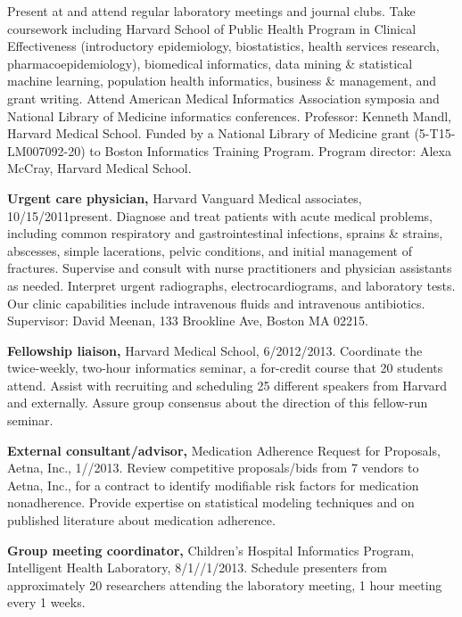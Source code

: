\documentclass[12pt]{article}
\begin{document}
Present at and attend regular laboratory meetings and journal clubs.
Take coursework including Harvard School of Public Health Program in
Clinical Effectiveness (introductory epidemiology, biostatistics,
health services research, pharmacoepidemiology), biomedical
informatics, data mining \& statistical machine learning, population
health informatics, business \& management, and grant writing. Attend
American Medical Informatics Association symposia and National Library
of Medicine informatics conferences. Professor: Kenneth Mandl, Harvard
Medical School. Funded by a National Library of Medicine grant
(5-T15-LM007092-20) to Boston Informatics Training Program. Program
director: Alexa McCray, Harvard Medical School.

\textbf{Urgent care physician,} Harvard Vanguard Medical associates,
10/15/2011\ndash{}present. Diagnose and treat patients with acute
medical problems, including common respiratory and gastrointestinal
infections, sprains \& strains, abscesses, simple lacerations, pelvic
conditions, and initial management of fractures. Supervise and consult
with nurse practitioners and physician assistants as needed. Interpret
urgent radiographs, electrocardiograms, and laboratory tests. Our
clinic capabilities include intravenous fluids and intravenous
antibiotics. Supervisor: David Meenan, 133 Brookline Ave, Boston MA
02215.

\textbf{Fellowship liaison,} Harvard Medical School,
6/2012/2013. Coordinate the twice-week\-ly, two-hour
informatics seminar, a for-credit course that 20 students attend.
Assist with recruiting and scheduling 25 different speakers from
Harvard and externally. Assure group consensus about the direction of
this fellow-run seminar.

\textbf{External consultant/advisor,} Medication Adherence Request for
Proposals, Aetna, Inc.,
1/\ndash{}/2013. Review competitive
proposals/bids from 7 vendors to Aetna, Inc., for a contract to
identify modifiable risk factors for medication nonadherence. Provide
expertise on statistical modeling techniques and on published
literature about medication adherence.

\textbf{Group meeting coordinator,} Children’s Hospital Informatics
Program, Intel\-li\-gent Health Lab\-o\-ra\-to\-ry,
8/1/\ndash{}/1/2013. Schedule
presenters from approximately 20 researchers attending the laboratory
meeting, 1 hour meeting every 1 weeks.
\end{document}
